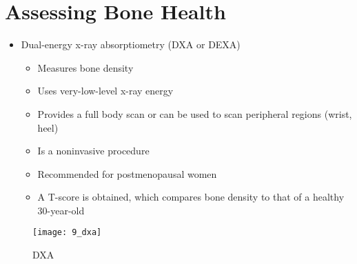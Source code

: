 \documentclass[title={Chapter 9}]{fdsn201notes}
\begin{document}
\section{Assessing Bone Health}\label{sec:assessing-bone-health}
\begin{itemize}
	\item Dual-energy x-ray absorptiometry (DXA or DEXA)
	\begin{itemize}
		\item Measures bone density
		\item Uses very-low-level x-ray energy
		\item Provides a full body scan or can be used to scan peripheral regions (wrist, heel)
		\item Is a noninvasive procedure
		\item Recommended for postmenopausal women
		\item A T-score is obtained, which compares bone density to that of a healthy 30-year-old
	\end{itemize}
\end{itemize}

\begin{figure}[H]
	\centering
	\texttt{[image: 9\_dxa]}
	\caption{DXA}
	\label{fig:dxa}
\end{figure}
\end{document}
